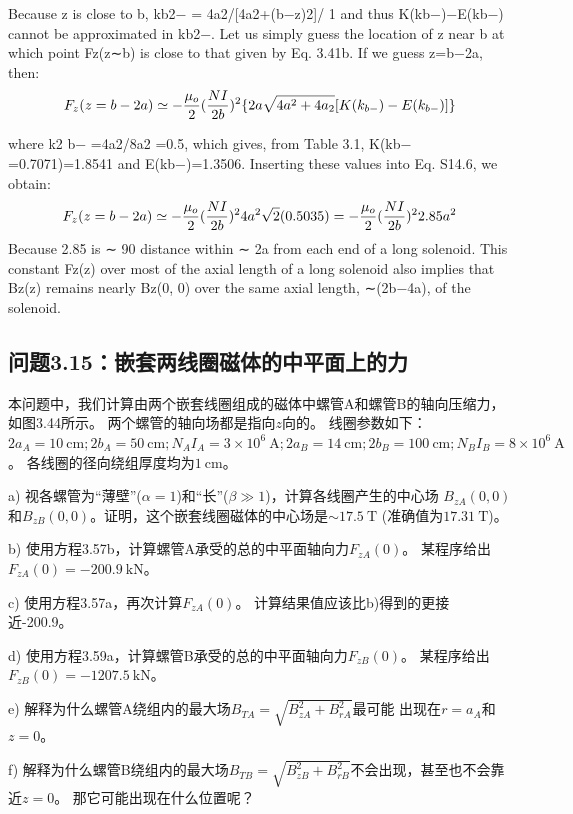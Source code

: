 Because z is close to b, kb2− = 4a2/[4a2+(b−z)2]/ 1 and thus K(kb−)−E(kb−)
cannot be approximated in kb2−. Let us simply guess the location of z near b at
which point Fz(z∼b) is close to that given by Eq. 3.41b. If we guess z=b−2a, then:
$$
F_{z}(z=b-2a)\simeq-\frac{\mu_{o}}{2}(\frac{NI}{2b})^{2}\{2a\sqrt{4a^{2}+4a_{2}}[K(k_{b-})-E(k_{b-})]\}\\%
$$

where k2
b− =4a2/8a2 =0.5, which gives, from Table 3.1, K(kb− =0.7071)=1.8541
and E(kb−)=1.3506. Inserting these values into Eq. S14.6, we obtain:
$$
F_{z}(z=b-2a)\simeq-\frac{\mu_{o}}{2}(\frac{NI}{2b})^{2}4a^{2}\sqrt{2}(0.5035)\\
=-\frac{\mu_{o}}{2}(\frac{NI}{2b})^{2}2.85a^{2}\\%
$$
Because 2.85 is ∼ 90%
distance within ∼ 2a from each end of a long solenoid. This constant Fz(z) over
most of the axial length of a long solenoid also implies that Bz(z) remains nearly
Bz(0, 0) over the same axial length, ∼(2b−4a), of the solenoid.
\newpage



\subsection{问题3.15：嵌套两线圈磁体的中平面上的力}
本问题中，我们计算由两个嵌套线圈组成的磁体中螺管A和螺管B的轴向压缩力，如图3.44所示。
两个螺管的轴向场都是指向$z$向的。
线圈参数如下：$2a_A=10\ \mathrm{cm};2b_A = 50\ \mathrm{cm}; N_A I_A = 3\times 10^6\ \mathrm{A};
2a_B = 14\ \mathrm{cm}; 2b_B = 100\ \mathrm{cm}; N_B I_B = 8\times10^6\ \mathrm{A}$。
各线圈的径向绕组厚度均为$1\ \mathrm{cm}$。

a) 视各螺管为“薄壁”($\alpha = 1$)和“长”($\beta\gg 1$)，计算各线圈产生的中心场
$B_{zA}(0, 0)$和$B_{zB}(0, 0)$。证明，这个嵌套线圈磁体的中心场是$\sim 17.5\ \mathrm{T}$
(准确值为$17.31\ \mathrm{T}$)。

b) 使用方程3.57b，计算螺管A承受的总的中平面轴向力$F_{zA}(0)$。
某程序给出$F_{zA}(0)=-200.9\ \mathrm{kN}$。

c) 使用方程3.57a，再次计算$F_{zA}(0)$。
计算结果值应该比b)得到的更接近-200.9。

d) 使用方程3.59a，计算螺管B承受的总的中平面轴向力$F_{zB}(0)$。
某程序给出$F_{zB}(0)=-1207.5\ \mathrm{kN}$。

e) 解释为什么螺管A绕组内的最大场$B_{TA}=\sqrt{B_{zA}^2 + B_{rA}^2}$最可能
	出现在$r=a_A$和$z=0$。
	
f) 解释为什么螺管B绕组内的最大场$B_{TB}=\sqrt{B_{zB}^2 + B_{rB}^2}$不会出现，甚至也不会靠近$z=0$。
那它可能出现在什么位置呢？

